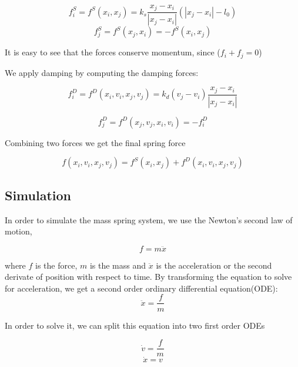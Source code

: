 \documentclass[en]{minipw} %
\begin{document}
\begin{equation}
f_{i}^{S} = f^{S}(x_i, x_j) = k_s \dfrac{x_j - x_i}{|x_j - x_i|}(|x_j - x_i| - l_0)
\end{equation}
\begin{equation}
f_{j}^{S} = f^{S}(x_j, x_i) = -f^{S}(x_i, x_j)
\end{equation}

It is easy to see that the forces conserve momentum, since ($f_i + f_j = 0$)

We apply damping by computing the damping forces:

\begin{equation}
f_{i}^{D} = f^{D}(x_i, v_i, x_j, v_j) = k_d (v_j - v_i) \dfrac{x_j - x_i}{|x_j - x_i|}
\end{equation}

\begin{equation}
f_{j}^{D} = f^{D}(x_j, v_j, x_i, v_i) = -f_{i}^{D}
\end{equation}

Combining two forces we get the final spring force

\begin{equation}
f(x_i, v_i, x_j, v_j) = f^{S}(x_i, x_j) + f^{D}(x_i, v_i, x_j, v_j)
\end{equation}

\subsection{Simulation}
In order to simulate the mass spring system, we use the Newton's second law of motion,

\begin{equation}
f = m \ddot{x}
\end{equation}

where $f$ is the force, $m$ is the mass and $\ddot{x}$ is the acceleration or the second derivate of position with respect to time. By transforming the equation to solve for acceleration, we get a second order ordinary differential equation(ODE):
\begin{equation}
\ddot{x} = \dfrac{f}{m}
\end{equation}

In order to solve it, we can split this equation into two first order ODEs

\begin{equation}
\label{eq:ode_v} 
\dot{v} = \dfrac{f}{m}
\end{equation}
\begin{equation}
\label{eq:ode_x} 
\dot{x} = v
\end{equation}
\end{document}
